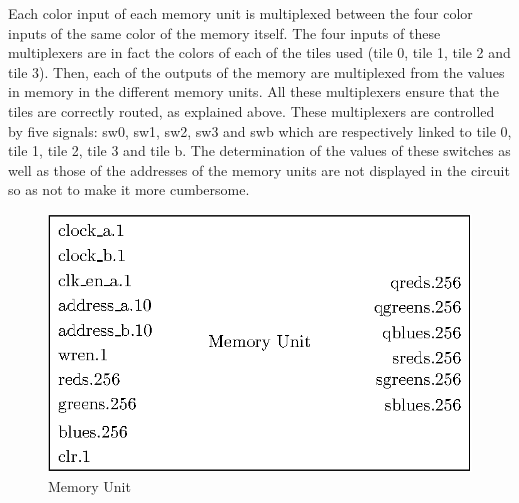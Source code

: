 Each color input of each memory unit is multiplexed between the four color inputs of the same color 
of the memory itself. The four inputs of these multiplexers are in fact the colors of each of the 
tiles used (tile 0, tile 1, tile 2 and tile 3). Then, each of the outputs of the memory are 
multiplexed from the values in memory in the different memory units. All these multiplexers ensure 
that the tiles are correctly routed, as explained above. These multiplexers are controlled by five 
signals: sw0, sw1, sw2, sw3 and swb which are respectively linked to tile 0, tile 1, tile 2, tile 3 
and tile b. The determination of the values of these switches as well as those of the addresses of 
the memory units are not displayed in the circuit so as not to make it more cumbersome.

\begin{figure}[H]
    \centering
    \includegraphics[scale=1.0]{Chapter4-GPU_CLKU/res/memory_unit}
    \caption{Memory Unit}
    \label{fig:gpu/memory_unit}
\end{figure}

